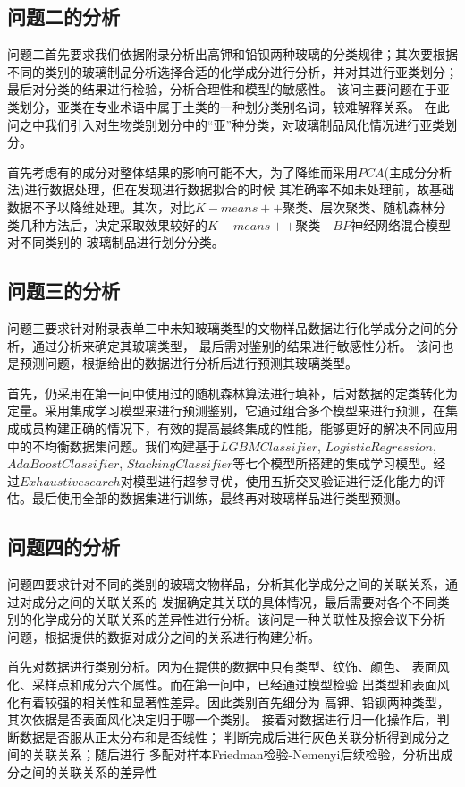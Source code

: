 \documentclass[UTF8]{ctexart}
\begin{document}
\subsection{问题二的分析}
问题二首先要求我们依据附录分析出高钾和铅钡两种玻璃的分类规律；其次要根据不同的类别的玻璃制品分析选择合适的化学成分进行分析，并对其进行亚类划分；
最后对分类的结果进行检验，分析合理性和模型的敏感性。 该问主要问题在于亚类划分，亚类在专业术语中属于土类的一种划分类别名词，较难解释关系。
在此问之中我们引入对生物类别划分中的“亚”种分类，对玻璃制品风化情况进行亚类划分。

首先考虑有的成分对整体结果的影响可能不大，为了降维而采用$PCA$(主成分分析法)进行数据处理，但在发现进行数据拟合的时候
其准确率不如未处理前，故基础数据不予以降维处理。其次，对比$K-means++$聚类、层次聚类、随机森林分类几种方法后，决定采取效果较好的$K-means++$聚类—$BP$神经网络混合模型对不同类别的
玻璃制品进行划分分类。





\subsection{问题三的分析}
问题三要求针对附录表单三中未知玻璃类型的文物样品数据进行化学成分之间的分析，通过分析来确定其玻璃类型，
最后需对鉴别的结果进行敏感性分析。 该问也是预测问题，根据给出的数据进行分析后进行预测其玻璃类型。

首先，仍采用在第一问中使用过的随机森林算法进行填补，后对数据的定类转化为定量。采用集成学习模型来进行预测鉴别，它通过组合多个模型来进行预测，在集成成员构建正确的情况下，有效的提高最终集成的性能，能够更好的解决不同应用中的不均衡数据集问题。我们构建基于$LGBMClassifier$, $LogisticRegression$, $AdaBoostClassifier$, $StackingClassifier$等七个模型所搭建的集成学习模型。经过$Exhaustive search$对模型进行超参寻优，使用五折交叉验证进行泛化能力的评估。最后使用全部的数据集进行训练，最终再对玻璃样品进行类型预测。


\subsection{问题四的分析}
问题四要求针对不同的类别的玻璃文物样品，分析其化学成分之间的关联关系，通过对成分之间的关联关系的
发掘确定其关联的具体情况，最后需要对各个不同类别的化学成分的关联关系的差异性进行分析。该问是一种关联性及擦会议下分析
问题，根据提供的数据对成分之间的关系进行构建分析。

首先对数据进行类别分析。因为在提供的数据中只有类型、纹饰、颜色、
表面风化、采样点和成分六个属性。而在第一问中，已经通过模型检验
出类型和表面风化有着较强的相关性和显著性差异。因此类别首先细分为
高钾、铅钡两种类型，其次依据是否表面风化决定归于哪一个类别。
接着对数据进行归一化操作后，判断数据是否服从正太分布和是否线性；
判断完成后进行灰色关联分析得到成分之间的关联关系；随后进行
多配对样本Friedman检验-Nemenyi后续检验，分析出成分之间的关联关系的差异性
\end{document}
